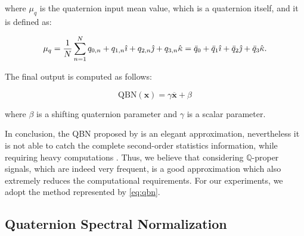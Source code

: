 \documentclass[graybox]{svmult}
\begin{document}
\noindent where $\mu_q$ is the quaternion input mean value, which is a quaternion itself, and it is defined as:

\begin{equation}
    \mu_q = \frac{1}{N} \sum_{n=1}^N q_{0,n} + q_{1,n} {\hat{\imath}} + q_{2,n} {\hat{\jmath}} + q_{3,n} {\hat{\kappa}} = \bar{q}_0 + \bar{q}_1 {\hat{\imath}} + \bar{q}_2 {\hat{\jmath}} + \bar{q}_3 {\hat{\kappa}}.    
\end{equation}







The final output is computed as follows:

\begin{equation}
    \text{QBN}(\mathbf{x}) = \gamma \overline{\mathbf{x}} + \beta
\label{eq:qbn}
\end{equation}

\noindent where $\beta$ is a shifting quaternion parameter and $\gamma$ is a scalar parameter.












In conclusion, the QBN proposed by \cite{GaudetIJCNN2018} is an elegant approximation, nevertheless it is not able to catch the complete second-order statistics information, while requiring heavy computations \cite{HoffmanAlgebraNets2020}. Thus, we believe that considering $\mathbb{Q}$-proper signals, which are indeed very frequent, is a good approximation which also extremely reduces the computational requirements. For our experiments, we adopt the method represented by \eqref{eq:qbn}.


\subsection{Quaternion Spectral Normalization}
\label{sec:qsn}
\end{document}
